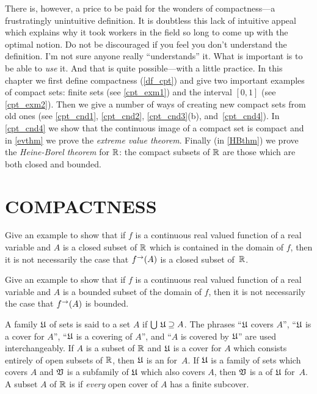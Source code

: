 There is, however, a price to be paid for the wonders of compactness---a frustratingly
unintuitive definition.  It is doubtless this lack of intuitive appeal which explains why it
took workers in the field so long to come up with the optimal notion. Do not be discouraged if
you feel you don't understand the definition.  I'm not sure anyone really ``understands'' it.
What is important is to be able to \emph{use} it.  And that is quite possible---with a little
practice. In this chapter we first define compactness (\ref{df_cpt}) and give two important
examples of compact sets: finite sets (see \ref{cpt_exm1}) and the interval $[0,1]$ (see
\ref{cpt_exm2}). Then we give a number of ways of creating new compact sets from old ones (see
\ref{cpt_cnd1}, \ref{cpt_cnd2}, \ref{cpt_cnd3}(b), and~\ref{cpt_cnd4}).  In \ref{cpt_cnd4} we
show that the continuous image of a compact set is compact and in \ref{evthm} we prove the
\emph{extreme value theorem}.  Finally (in \ref{HBthm}) we prove the \emph{Heine-Borel
theorem} for $\mathbb{R}$: the compact subsets of $\mathbb{R}$ are those which are both closed and bounded.





\section{COMPACTNESS}
\begin{prob}\label{evt_pr1} Give an example to show that if $f$ is a continuous real valued
function of a real variable and $A$ is a closed subset of $\mathbb{R}$ which is contained in the
domain of $f$, then it is not necessarily the case that $f^\rightarrow(A)$ is a closed subset
of~$\mathbb{R}$.
\end{prob}

\begin{prob}\label{evt_pr2} Give an example to show that if $f$ is a continuous real valued
function of a real variable and $A$ is a bounded subset of the domain of $f$, then it is not
necessarily the case that $f^\rightarrow(A)$ is bounded.
\end{prob}

\begin{defn}\label{df_cpt} A family $\mathfrak{U}$ of sets is said to
 a set $A$ if $\bigcup\,\mathfrak{U} \supseteq A$.  The phrases ``$\mathfrak{U}$ covers
$A$'', ``$\mathfrak{U}$ is a cover for $A$'',  ``$\mathfrak{U}$ is a covering of $A$'', and ``$A$
is covered by $\mathfrak{U}$'' are used interchangeably.  If $A$ is a subset of $\mathbb{R}$ and
$\mathfrak{U}$ is a cover for $A$ which consists entirely of open subsets of $\mathbb{R}$, then $\mathfrak{U}$ is an
 for~$A$.  If $\mathfrak{U}$ is a family of sets which covers $A$ and $\mathfrak{V}$
is a subfamily of $\mathfrak{U}$ which also covers $A$, then $\mathfrak{V}$ is a
 of $\mathfrak{U}$ for~$A$.  A subset $A$ of $\mathbb{R}$ is
 if \emph{every} open cover of $A$ has a finite subcover.
\end{defn}

